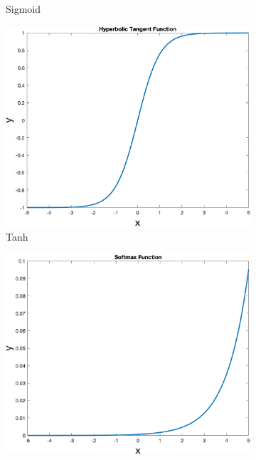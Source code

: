 \begin{figure}[!ht]
\begin{subfigure}[b]{0.3\textwidth}
            \caption{Sigmoid}
            \label{fig:sigmoid}
        \end{subfigure}
        \begin{subfigure}[b]{0.3\textwidth}
            \includegraphics[width=\textwidth]{figures/tanh}
            \caption{Tanh}
            \label{fig:tahn}
        \end{subfigure}
        \hspace{0.1\textwidth}
        \begin{subfigure}[b]{0.3\textwidth}
            \includegraphics[width=\textwidth]{figures/softmax}

\end{subfigure}
\end{figure}
